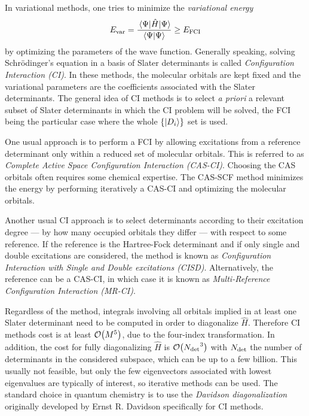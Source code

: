 \documentclass[./thesis.tex]{subfiles}
\begin{document}
In variational methods, one tries to minimize the \emph{variational energy}
\begin{equation}
E_\text{var} = \frac{\mel{\Psi}{\hat{H}}{\Psi}}{\braket{\Psi}{\Psi}} \ge E_\text{FCI}
\label{eq:evar}
\end{equation}
by optimizing the parameters of the wave function.
Generally speaking, solving Schrö\-dinger's equation in a basis of Slater determinants is called \emph{Configuration Interaction (CI)}.
In these methods, the molecular orbitals are kept fixed and the variational parameters are the coefficients associated with the Slater determinants.
The general idea of CI methods is to select \textit{a priori} a relevant subset
of Slater determinants in which the CI problem will be solved, the FCI being
the particular case where the whole $\{\ket {D_i} \}$ set is used.

One usual approach is to perform a FCI by allowing excitations from a reference determinant only within a reduced set of molecular orbitals. This is referred to as \emph{Complete Active Space Configuration Interaction (CAS-CI)}. Choosing the CAS orbitals often requires some chemical expertise. The CAS-SCF method minimizes the energy by performing iteratively a CAS-CI and optimizing the molecular orbitals.

Another usual CI approach is to select determinants according to their excitation degree --- by how many occupied orbitals they differ --- with respect to some reference. If the reference is the Hartree-Fock determinant and if only single and double excitations are considered, the method is known as \emph{Configuration Interaction with Single and Double excitations (CISD)}. Alternatively, the reference can be a CAS-CI, in which case it is known as \emph{Multi-Reference Configuration Interaction (MR-CI)}.

Regardless of the method, integrals involving all orbitals implied in at least one Slater determinant need to be computed in order to diagonalize $\widehat{H}$. Therefore CI methods cost is at least $\order{M^5}$, due to the four-index transformation.
In addition, the cost for fully diagonalizing $\widehat{H}$ is $\order{\Ndet^3}$ with ${N_\text{det}}$ the number of determinants in the considered subspace, which can be up to a few billion. This usually not feasible, but only the few eigenvectors associated with lowest eigenvalues are typically of interest, so iterative methods can be used. The standard choice in quantum chemistry is to use the \emph{Davidson diagonalization} originally developed by Ernst R. Davidson\cite{Davidson_1975} specifically for CI methods. 
\end{document}
